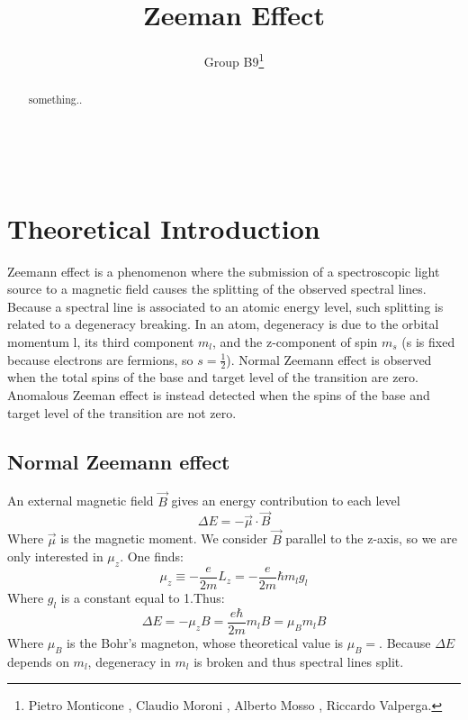 \documentclass[a4paper,12pt,abstracton]{scrartcl}
\title{Zeeman Effect}
\author{Group B9\footnote{Pietro Monticone , Claudio Moroni , Alberto Mosso , Riccardo Valperga.}}
\begin{document}
\maketitle
\makenomenclature
\begin{abstract}
something..
\end{abstract}
\clearpage
\tableofcontents

\mbox{
}
\newpage
\setlength{\columnsep}{27pt} 
\begin{multicols}{2}
\printnomenclature
\end{multicols}
\newpage
\section{Theoretical Introduction}
Zeemann effect is a phenomenon where the submission of a spectroscopic light source to a magnetic field causes the splitting of the observed spectral lines. Because a spectral line is associated to an atomic energy level, such splitting is related to a degeneracy breaking. In an atom, degeneracy is due to the orbital momentum l, its third component $m_l$, and the z-component of spin $m_s$ (s is fixed  because electrons are fermions, so $s=\frac{1}{2}$).\newline
Normal Zeemann effect is observed when the total spins of the base and target level of the transition are zero.
Anomalous Zeeman effect is instead detected when the spins of the base and target level of the transition are not zero.
\subsection{Normal Zeemann effect}
An external magnetic field $\vec{B}$ gives an energy contribution to each level
\begin{equation}
\Delta E = - \vec{\mu} \cdot \vec{B}
\end{equation}
Where $\vec{\mu}$ is the magnetic moment. We consider $\vec{B}$ parallel to the z-axis, so we are only interested in $\mu_z$. One finds: 
\begin{equation}
\mu_z \equiv -\frac{e}{2m}L_z = -\frac{e}{2m}\hbar m_lg_l
\end{equation}
Where $g_l$ is a constant equal to 1.Thus:
\begin{equation}
\Delta E = - \mu_z B = \frac{e \hbar}{2m} m_l B = \mu_B m_l B
\end{equation}
Where $\mu_B$ is the Bohr's magneton, whose theoretical value is
$\mu_B = $. Because $\Delta E$ depends on $m_l$, degeneracy in $m_l$ is broken and thus spectral lines split.
\end{document}

